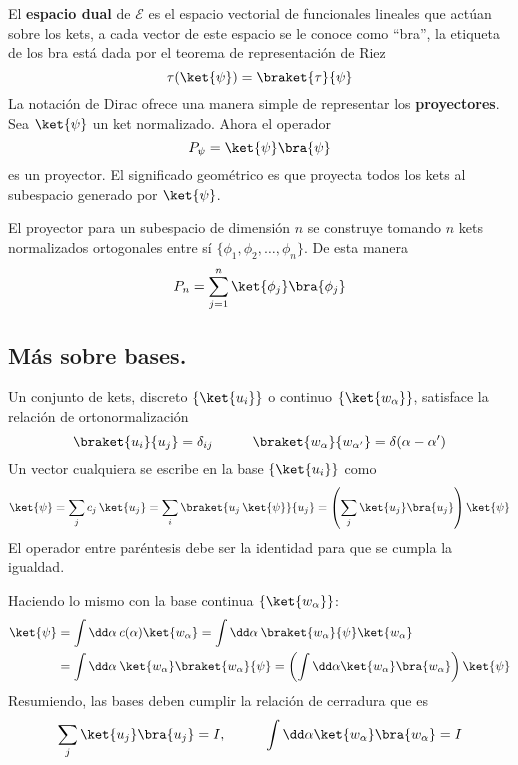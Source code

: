 El \textbf{espacio dual} de $\mathcal{E}$ es el espacio vectorial de funcionales lineales que actúan sobre los kets, a cada vector de este espacio se le conoce como \enquote{bra}, la etiqueta de los bra está dada por el
teorema de representación de Riez
\[ \tau (\ket{\psi}) = \braket{\tau}{\psi} \]
La notación de Dirac ofrece una manera simple de representar los \textbf{proyectores}. Sea $\ket{\psi}$ un ket normalizado. Ahora el operador
\[ P_{\psi} =  \ket{\psi} \bra{\psi} \]
es un proyector. El significado geométrico es que proyecta todos los kets al subespacio generado por $\ket{\psi}$.
\par
El proyector para un subespacio de dimensión $n$ se construye tomando $n$ kets normalizados ortogonales entre sí $\{ \phi_{1}, \phi_{2}, \ldots, \phi_{n} \}$. De esta manera
\[ P_{n} = \sum_{j=1}^{n} \ket{\phi_{j}} \bra{\phi_{j}}\]
\subsection*{Más sobre bases.}
Un conjunto de kets, discreto $\{ \ket{u_{i}} \}$ o continuo $\{ \ket{w_{\alpha}} \}$, satisface la relación de ortonormalización
\[ \braket{u_{i}}{u_{j}} = \delta_{ij} \hspace{1cm} \braket{w_{\alpha}}{w_{\alpha^{\prime}}} = \delta(\alpha - \alpha^{\prime}) \]
Un vector cualquiera se escribe en la base $\{ \ket{u_{i}} \}$ como 
\[ \ket{\psi} =  \sum_{j} c_{j} \, \ket{u_{j}} = \sum_{i} \braket{u_{j} \, \ket{\psi}}{u_{j}} = \left( \sum_{j} \ket{u_{j}} \bra{u_{j}} \right) \ket{\psi} \]
El operador entre paréntesis debe ser la identidad para que se cumpla la igualdad.
\par
Haciendo lo mismo con la base continua $\{ \ket{w_{\alpha}} \}$:
\begin{align*}
\ket{\psi} &= \int \dd \alpha \: c (\alpha) \ket{w_{\alpha}} = \int \dd \alpha \: \braket{w_{\alpha}}{\psi} \ket{w_{\alpha}} \\
&= \int \dd \alpha \: \ket{w_{\alpha}} \braket{w_{\alpha}}{\psi} = \left( \int \dd \alpha \ket{w_{\alpha}} \bra{w_{\alpha}} \right) \ket{\psi} 
\end{align*}
Resumiendo, las bases deben cumplir la relación de cerradura que es
\[ \sum_{j} \ket{u_{j}} \bra{u_{j}} = I, \hspace{1cm} \int \dd \alpha \ket{w_{\alpha}} \bra{w_{\alpha}} = I \]
